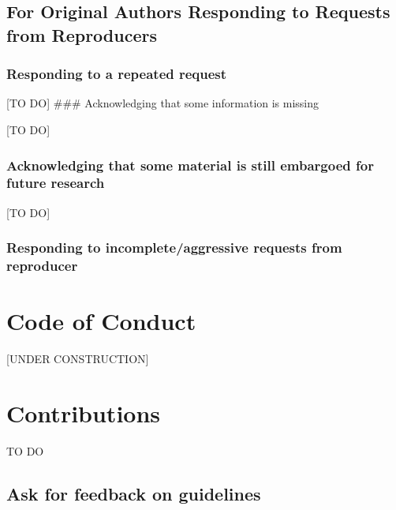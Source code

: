 \documentclass[]{book}
\begin{document}
\hypertarget{for-original-authors-responding-to-requests-from-reproducers}{%
\section{For Original Authors Responding to Requests from Reproducers}\label{for-original-authors-responding-to-requests-from-reproducers}}

\hypertarget{responding-to-a-repeated-request}{%
\subsection{Responding to a repeated request}\label{responding-to-a-repeated-request}}

{[}TO DO{]}
\#\#\# Acknowledging that some information is missing

{[}TO DO{]}

\hypertarget{acknowledging-that-some-material-is-still-embargoed-for-future-research}{%
\subsection{Acknowledging that some material is still embargoed for future research}\label{acknowledging-that-some-material-is-still-embargoed-for-future-research}}

{[}TO DO{]}

\hypertarget{responding-to-incompleteaggressive-requests-from-reproducer}{%
\subsection{Responding to incomplete/aggressive requests from reproducer}\label{responding-to-incompleteaggressive-requests-from-reproducer}}

\hypertarget{code-of-conduct}{%
\chapter{Code of Conduct}\label{code-of-conduct}}

{[}UNDER CONSTRUCTION{]}

\hypertarget{contributions}{%
\chapter{Contributions}\label{contributions}}

TO DO

\hypertarget{ask-for-feedback-on-guidelines}{%
\section{Ask for feedback on guidelines}\label{ask-for-feedback-on-guidelines}}
\end{document}
